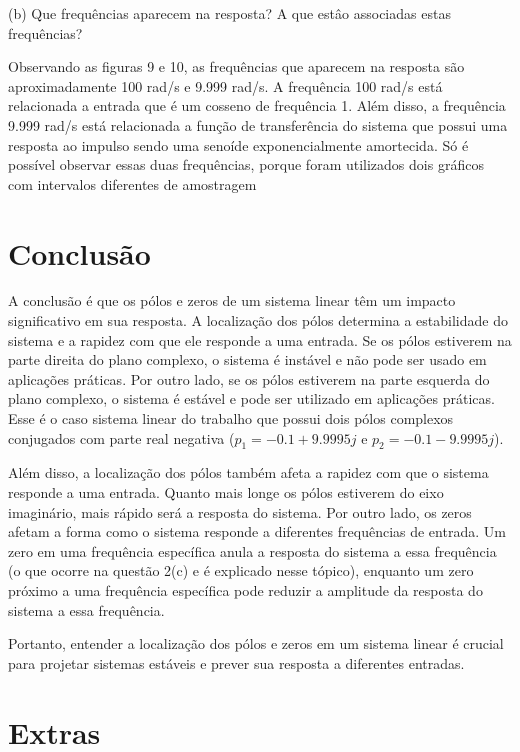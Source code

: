 \documentclass[10pt]{article}
\begin{document}
(b) Que frequências aparecem na resposta? A que estâo associadas estas frequências?

\quad Observando as figuras 9 e 10, as frequências que aparecem na resposta são aproximadamente 100 rad/s e 9.999 rad/s.
A frequência 100 rad/s está relacionada a entrada que é um cosseno de frequência 1.
Além disso, a frequência 9.999 rad/s está relacionada a função de transferência do sistema
que possui uma resposta ao impulso sendo uma senoíde exponencialmente amortecida.
Só é possível observar essas duas frequências,
porque foram utilizados dois gráficos com intervalos diferentes de amostragem


\newpage

\section{Conclusão}

\quad A conclusão é que os pólos e zeros de um sistema linear têm um impacto significativo em sua resposta.
A localização dos pólos determina a estabilidade do sistema e a rapidez com que ele responde a uma entrada.
Se os pólos estiverem na parte direita do plano complexo, o sistema é instável e não pode ser usado em aplicações práticas.
Por outro lado, se os pólos estiverem na parte esquerda do plano complexo, o sistema é estável e pode ser utilizado em aplicações práticas.
Esse é o caso sistema linear do trabalho que possui dois pólos complexos conjugados com parte real negativa ($p_1 = -0.1 + 9.9995j$ e $p_2 = -0.1 - 9.9995j$).

\quad Além disso, a localização dos pólos também afeta a rapidez com que o sistema responde a uma entrada.
Quanto mais longe os pólos estiverem do eixo imaginário, mais rápido será a resposta do sistema. Por outro lado,
os zeros afetam a forma como o sistema responde a diferentes frequências de entrada.
Um zero em uma frequência específica anula a resposta do sistema a essa frequência
(o que ocorre na questão 2(c) e é explicado nesse tópico),
enquanto um zero próximo a uma frequência específica pode reduzir a amplitude da resposta do sistema a essa frequência.

\quad Portanto, entender a localização dos pólos e zeros em um sistema linear é crucial para projetar sistemas estáveis e prever sua resposta a diferentes entradas.
\newpage

\section{Extras}
\end{document}
